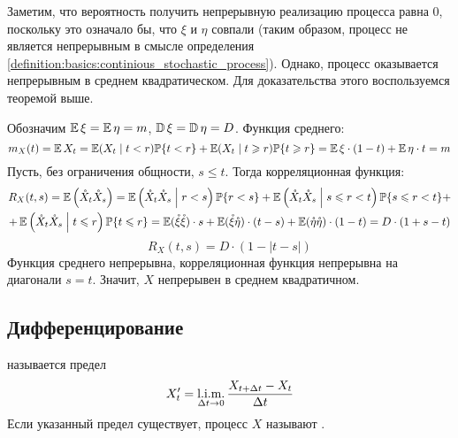 \begin{solution}
    Заметим, что вероятность получить непрерывную реализацию процесса равна $ 0 $,
    поскольку это означало бы, что $ \xi $ и $ \eta $ совпали
    (таким образом, процесс не является непрерывным в смысле определения \ref{definition:basics:continious_stochastic_process}).
    Однако, процесс оказывается непрерывным в среднем квадратическом.
    Для доказательства этого воспользуемся теоремой выше.

    Обозначим $ \operatorname{\mathbb{E}} \xi = \operatorname{\mathbb{E}} \eta = m $, $ \operatorname{\mathbb{D}} \xi = \operatorname{\mathbb{D}} \eta = D $.
    Функция среднего:
    \[
        m_X(t) = \operatorname{\mathbb{E}} X_t = \operatorname{\mathbb{E}} (X_t \mid t < r) \mathbb{P} \{t < r\} + \operatorname{\mathbb{E}} (X_t \mid t \geqslant r) \mathbb{P} \{t \geqslant r\} = \operatorname{\mathbb{E}} \xi \cdot (1 - t) + \operatorname{\mathbb{E}} \eta \cdot t = m
    \]
    Пусть, без ограничения общности, $ s \leqslant t $.
    Тогда корреляционная функция:
    \begin{multline*}
        R_X(t,s) = \operatorname{\mathbb{E}} \left( \mathring{X}_t \mathring{X}_s \right) =
        \operatorname{\mathbb{E}} \left( \mathring{X}_t \mathring{X}_s \;\middle|\; r < s \right) \mathbb{P} \{r < s\} +
        \operatorname{\mathbb{E}} \left( \mathring{X}_t \mathring{X}_s \;\middle|\; s \leqslant r < t \right) \mathbb{P} \{s \leqslant r < t\} + \\
        + \operatorname{\mathbb{E}} \left( \mathring{X}_t \mathring{X}_s \;\middle|\; t \leqslant r \right) \mathbb{P} \{t \leqslant r\} =
        \operatorname{\mathbb{E}} (\mathring{\xi} \mathring{\xi}) \cdot s +
        \operatorname{\mathbb{E}} (\mathring{\xi} \mathring{\eta}) \cdot (t - s) +
        \operatorname{\mathbb{E}} (\mathring{\eta} \mathring{\eta}) \cdot (1 - t) =
        D \cdot (1 + s - t)
    \end{multline*}
    \[
        R_X(t, s) = D \cdot (1 - |t - s|)
    \]
    Функция среднего непрерывна, корреляционная функция непрерывна на диагонали $ s = t $.
    Значит, $ X $ непрерывен в среднем квадратичном.
\end{solution}



\subsection{Дифференцирование} \label{subsection:derivative}

\begin{definition}
    \label{definition:calculus:derivative}
     называется предел
    \[
        X_t' = \operatorname*{\textnormal{l.i.m.}}_{\Delta t \to 0} \frac{X_{t + \Delta t} - X_t}{\Delta t}
    \]
    Если указанный предел существует, процесс $ X $ называют .
\end{definition}

